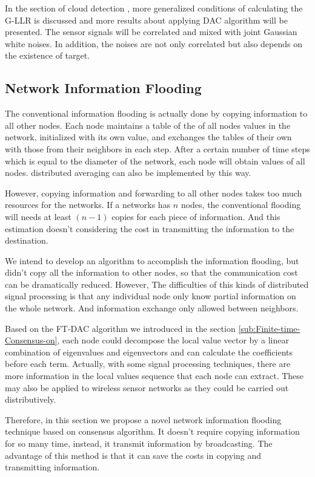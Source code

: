 In the section of cloud detection ,
more generalized conditions of calculating the G-LLR is discussed
and more results about applying DAC algorithm will be presented. The
sensor signals will be correlated and mixed with joint Gaussian white
noises. In addition, the noises are not only correlated but also depends
on the existence of target. 


\subsection{Network Information Flooding}

The conventional information flooding is actually done by copying
information to all other nodes. Each node maintains a table of the
of all nodes values in the network, initialized with its own value,
and exchanges the tables of their own with those from their neighbors
in each step. After a certain number of time steps which is equal
to the diameter of the network, each node will obtain values of all
nodes. distributed averaging can also be implemented by this way. 

However, copying information and forwarding to all other nodes takes
too much resources for the networks. If a networks has $n$ nodes,
the conventional flooding will needs at least $\left(n-1\right)$
copies for each piece of information. And this estimation doesn't
considering the cost in transmitting the information to the destination.

We intend to develop an algorithm to accomplish the information flooding,
but didn't copy all the information to other nodes, so that the communication
cost can be dramatically reduced. However, The difficulties of this
kinds of distributed signal processing is that any individual node
only know partial information on the whole network. And information
exchange only allowed between neighbors. 

Based on the FT-DAC algorithm we introduced in the section \ref{sub:Finite-time-Consensus-on},
each node could decompose the local value vector by a linear combination
of eigenvalues and eigenvectors and can calculate the coefficients
before each term. Actually, with some signal processing techniques,
there are more information in the local values sequence that each
node can extract. These may also be applied to wireless sensor networks
as they could be carried out distributively. 

Therefore, in this section we propose a novel network information
flooding technique based on consensus algorithm. It doesn't require
copying information for so many time, instead, it transmit information
by broadcasting. The advantage of this method is that it can save
the costs in copying and transmitting information. 

